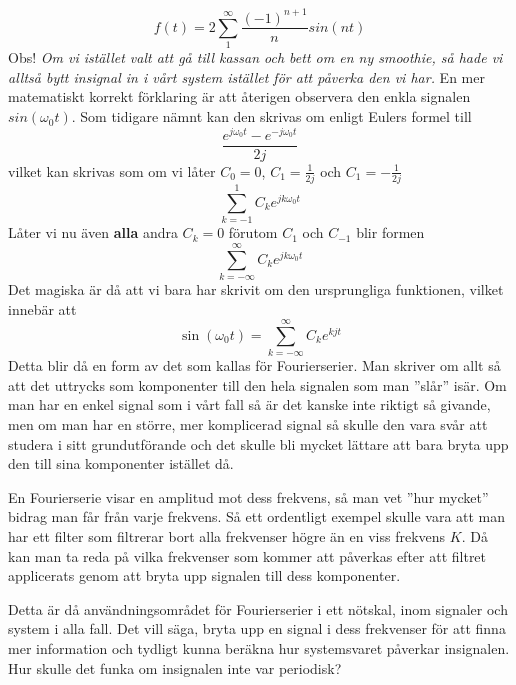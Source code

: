 \documentclass{article}
\begin{document}
\[f(t) = 2 \sum_{1}^{\infty} \frac{(-1)^{n+1}}{n} sin(n t) \]
Obs! \emph{Om vi istället valt att gå till kassan och bett om en ny smoothie, så hade vi alltså bytt insignal in i vårt system istället för att påverka den vi har.}
En mer matematiskt korrekt förklaring är att återigen observera den enkla signalen $sin(\omega_0 t)$. Som tidigare nämnt kan den skrivas om enligt Eulers formel till
\[ \frac{e^{j \omega_0 t} - e^{-j \omega_0 t}}{2j}\]
vilket kan skrivas som om vi låter $C_0=0$, $C_{1}=\frac{1}{2j}$ och $C_{1}=-\frac{1}{2j}$
\[ \sum_{k=-1}^1 C_k e^{j k \omega_0 t} \]
Låter vi nu även \textbf{alla} andra $C_k = 0$ förutom  $C_1$ och $C_{-1}$ blir formen
\[ \sum_{k=-\infty}^{\infty} C_k e^{j k \omega_0 t} \]
Det magiska är då att vi bara har skrivit om den ursprungliga funktionen, vilket innebär att 
\[ \sin(\omega_0 t) = \sum_{k=-\infty}^{\infty} C_k e^{k j t} \]
Detta blir då en form av det som kallas för Fourierserier. Man skriver om allt så att det uttrycks som komponenter till den hela signalen som man ''slår'' isär. Om man har en enkel signal som i vårt fall så är det kanske inte riktigt så givande, men om man har en större, mer komplicerad signal så skulle den vara svår att studera i sitt grundutförande och det skulle bli mycket lättare att bara bryta upp den till sina komponenter istället då.

En Fourierserie visar en amplitud mot dess frekvens, så man vet ''hur mycket'' bidrag man får från varje frekvens. Så ett ordentligt exempel skulle vara att man har ett filter som filtrerar bort alla frekvenser högre än en viss frekvens $K$. %
Då kan man ta reda på vilka frekvenser som kommer att påverkas efter att filtret applicerats genom att bryta upp signalen till dess komponenter. 

Detta är då användningsområdet för Fourierserier i ett nötskal, inom signaler och system i alla fall. Det vill säga, bryta upp en signal i dess frekvenser för att finna mer information och tydligt kunna beräkna hur systemsvaret påverkar insignalen. Hur skulle det funka om insignalen inte var periodisk? 
\end{document}
